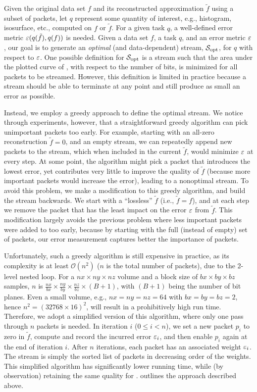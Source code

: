 Given the original data set $f$ and its reconstructed approximation $\tilde{f}$ using a subset of
packets, let $q$ represent some quantity of interest, e.g., histogram, isosurface, etc., computed on
$f$ or $\tilde{f}$. For a given task $q$, a well-defined error metric $\err(q(\tilde{f}),q(f))$ is
needed. Given a data set $f$, a task $q$, and an error metric $\err$, our goal is to generate an
\emph{optimal} (and data-dependent) stream, $\sopt$, for $q$ with respect to $\err$. One possible
definition for $\sopt$ is a stream such that the area under the plotted curve of \err, with respect
to the number of bits, is minimized for all packets to be streamed. However, this definition is
limited in practice because a stream should be able to terminate at any point and still produce as
small an error as possible.

Instead, we employ a greedy approach to define the optimal stream. We notice through experiments,
however, that a straightforward greedy algorithm can pick unimportant packets too early. For
example, starting with an all-zero reconstruction $\tilde{f}=0$, and an empty stream, we can
repeatedly append new packets to the stream, which when included in the current $\tilde{f}$, would
minimize $\err$ at every step. At some point, the algorithm might pick a packet that introduces the
lowest error, yet contributes very little to improve the quality of $\tilde{f}$ (because more
important packets would increase the error), leading to a nonoptimal stream. To avoid this problem,
we make a modification to this greedy algorithm, and build the stream backwards. We start with a
``lossless'' $\tilde{f}$ (i.e., $\tilde{f}=f$), and at each step we remove the packet that has the
least impact on the error $\err$ from $\tilde{f}$. This modification largely avoids the previous
problem where less important packets were added to \sopt too early, because by starting with the
full (instead of empty) set of packets, our error measurement captures better the importance of
packets.

Unfortunately, such a greedy algorithm is still expensive in practice, as its complexity is at least
$\mathcal{O}(n^2)$ ($n$ is the total number of packets), due to the 2-level nested loop. For a
$nx\times ny \times nz$ volume and a block size of $bx\times by\times bz$ samples, $n$ is
$\frac{nx}{bx}\times \frac{ny}{by}\times \frac{nz}{bz} \times (B+1)$, with $(B+1)$ being the number
of bit planes. Even a small volume, e.g., $nx=ny=nz=64$ with $bx=by=bz=2$, hence $n^2=(32768\times
16)^2$, will result in a prohibitively high run time. Therefore, we adopt a simplified version of
this algorithm, where only one pass through $n$ packets is needed. In iteration $i$ ($0\leq i < n$),
we set a new packet $p_i$ to zero in $\tilde{f}$, compute and record the incurred error $\err_i$,
and then enable $p_i$ again at the end of iteration $i$. After $n$ iterations, each packet has an
associated weight $\err_i$. The stream \sopt is simply the sorted list of packets in decreasing
order of the weights. This simplified algorithm has significantly lower running time, while (by
observation) retaining the same quality for \sopt.  outlines the approach described
above.

